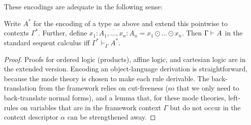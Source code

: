 \documentclass[a4paper,USenglish,numberwithinsect]{lipics-v2016}
\newcommand\seq[3]{\ensuremath{#1 \vdash_{#2} #3}}
\newcommand\seql[3]{\ensuremath{#1 \vdash^{\dsd{#2}} #3}}
\newcommand\vars[1]{\ensuremath{\overline{#1}}}
\begin{document}
These encodings are adequate in the following sense:
\begin{theorem}
Write $A^*$ for the encoding of a type as above and extend this
pointwise to contexts $\Gamma^*$.  Further, define
$\vars{x_1:A_1,\ldots,x_n:A_n} = x_1 \odot \ldots \odot x_n$.  Then
$\seql{\Gamma}{}{A}$ in the standard sequent calculus iff
$\seq{\Gamma^*}{\vars{\Gamma}}{A^*}$.
\end{theorem}
\begin{proof}
Proofs for ordered logic (products), affine logic, and cartesian logic
are in the extended version. Encoding an object-language derivation is
straightforward, because the mode theory is chosen to make each rule
derivable.  The back-translation from the framework relies on
cut-freeness (so that we only need to back-translate normal forms), and
a lemma that, for these mode theories, left-rules on variables that are
in the framework context $\Gamma$ but do not occur in the context
descriptor $\alpha$ can be strengthened away.
\end{proof}
\end{document}
